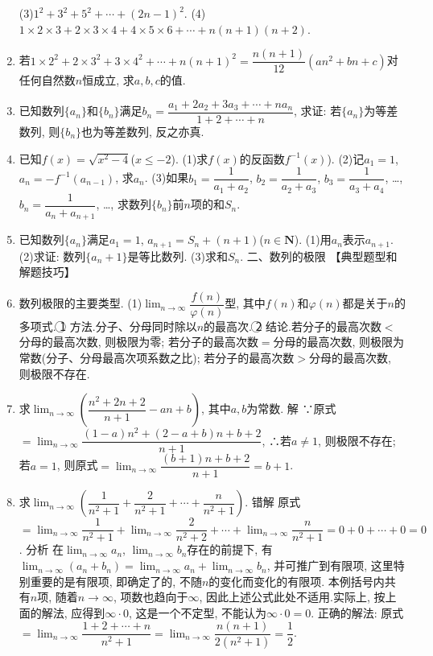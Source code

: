\documentclass[10pt,a4paper]{article}
\begin{document}
\begin{enumerate}[1.]
(3)$1^2+3^2+5^2+\cdots +(2n-1)^2$.
(4)$1\times 2\times 3+2\times 3\times 4+4\times 5\times 6+\cdots +n(n+1)(n+2)$.
\item 若$1\times 2^2+2\times 3^2+3\times 4^2+\cdots +n(n+1)^2=\dfrac{n(n+1)}{12}(an^2+bn+c)$对任何自然数$n$恒成立, 求$a,b,c$的值.
\item 已知数列$\{a_n\}$和$\{b_n\}$满足$b_n=\dfrac{{a_1}+2{a_2}+3{a_3}+\cdots +n{a_n}}{1+2+\cdots +n}$, 求证: 若$\{a_n\}$为等差数列, 则$\{b_n\}$也为等差数列, 反之亦真.
\item 已知$f(x)=\sqrt {x^2-4}$($x\le -2$).
(1)求$f(x)$的反函数$f^{-1}(x)$).
(2)记$a_1=1$, $a_n=-f^{-1}(a_{n-1})$, 求$a_n$.
(3)如果$b_1=\dfrac 1{a_1+a_2}$, $b_2=\dfrac 1{a_2+a_3}$, $b_3=\dfrac 1{a_3+a_4}$, …, $b_n=\dfrac 1{a_n+a_{n+1}}$, …, 求数列$\{b_n\}$前$n$项的和$S_n$.
\item 已知数列$\{a_n\}$满足$a_1=1$, $a_{n+1}=S_n+(n+1)$($n\in \mathbf{N}$).
(1)用$a_n$表示$a_{n+1}$.
(2)求证: 数列$\{a_n+1\}$是等比数列.
(3)求和$S_n$.
二、数列的极限
【典型题型和解题技巧】
\item 数列极限的主要类型.
(1)$\displaystyle \lim_{n\to \infty} \dfrac{f(n)}{\varphi (n)}$型, 其中$f(n)$和$\varphi (n)$都是关于$n$的多项式.
\textcircled{1} 方法.分子、分母同时除以$n$的最高次.
\textcircled{2} 结论.若分子的最高次数$<$分母的最高次数, 则极限为零; 若分子的最高次数$=$分母的最高次数, 则极限为常数(分子、分母最高次项系数之比); 若分子的最高次数$>$分母的最高次数, 则极限不存在.
\item 求$\displaystyle \lim_{n\to \infty} (\dfrac{{n^2}+2n+2}{n+1}-an+b)$, 其中$a,b$为常数.
解  ∵原式$=\displaystyle \lim_{n\to \infty} \dfrac{(1-a){n^2}+(2-a+b)n+b+2}{n+1}$, ∴若$a\ne 1$, 则极限不存在;
若$a=1$, 则原式$=\displaystyle \lim_{n\to \infty} \dfrac{(b+1)n+b+2}{n+1}=b+1$.
\item 求$\displaystyle \lim_{n\to \infty} (\dfrac 1{n^2+1}+\dfrac 2{n^2+1}+\cdots +\dfrac n{n^2+1})$.
错解  原式$=\displaystyle \lim_{n\to \infty} \dfrac 1{n^2+1}+\displaystyle \lim_{n\to \infty} \dfrac 2{n^2+2}+\cdots +\displaystyle \lim_{n\to \infty} \dfrac n{n^2+1}=0+0+\cdots +0=0$.
分析  在$\displaystyle \lim_{n\to \infty} a_n$, $\displaystyle \lim_{n\to \infty} b_n$存在的前提下, 有$\displaystyle \lim_{n\to \infty} (a_n+b_n)=\displaystyle \lim_{n\to \infty} a_n+\displaystyle \lim_{n\to \infty} b_n$, 并可推广到有限项, 这里特别重要的是有限项, 即确定了的, 不随$n$的变化而变化的有限项.
本例括号内共有$n$项, 随着$n\to \infty$, 项数也趋向于$\infty$, 因此上述公式此处不适用.实际上, 按上面的解法, 应得到$\infty \cdot 0$, 这是一个不定型, 不能认为$\infty \cdot 0=0$.
正确的解法: 原式$=\displaystyle \lim_{n\to \infty} \dfrac{1+2+\cdots +n}{{n^2}+1}=\displaystyle \lim_{n\to \infty} \dfrac{n(n+1)}{2({n^2}+1)}=\dfrac 12$.

\end{enumerate}
\end{document}
